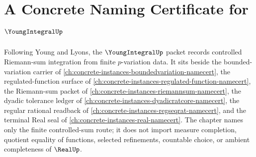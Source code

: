 \chapter{A Concrete Naming Certificate for $\YoungIntegralUp$}
\label{ch:concrete-instances-young-integral-namecert}

Following Young and Lyons, the $\YoungIntegralUp$ packet records controlled Riemann-sum integration from finite $p$-variation data. It sits beside the bounded-variation carrier of \autoref{ch:concrete-instances-boundedvariation-namecert}, the regulated-function surface of \autoref{ch:concrete-instances-regulated-function-namecert}, the Riemann-sum packet of \autoref{ch:concrete-instances-riemannsum-namecert}, the dyadic tolerance ledger of \autoref{ch:concrete-instances-dyadicratcore-namecert}, the regular rational readback of \autoref{ch:concrete-instances-regseqrat-namecert}, and the terminal Real seal of \autoref{ch:concrete-instances-real-namecert}. The chapter names only the finite controlled-sum route; it does not import measure completion, quotient equality of functions, selected refinements, countable choice, or ambient completeness of $\RealUp$.

